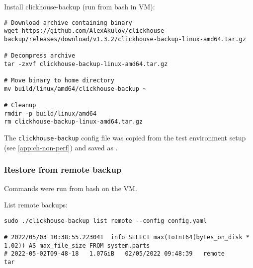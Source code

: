 Install clickhouse-backup (run from bash in VM):
\begin{verbatim}
# Download archive containing binary
wget https://github.com/AlexAkulov/clickhouse-backup/releases/download/v1.3.2/clickhouse-backup-linux-amd64.tar.gz

# Decompress archive
tar -zxvf clickhouse-backup-linux-amd64.tar.gz

# Move binary to home directory
mv build/linux/amd64/clickhouse-backup ~

# Cleanup
rmdir -p build/linux/amd64
rm clickhouse-backup-linux-amd64.tar.gz
\end{verbatim}

The \texttt{clickhouse-backup} config file was copied from
the test environment setup (see \ref{app:ch-non-perf})
and saved as .

\subsubsection{Restore from remote backup}
\label{sec:org8a05b22}
Commands were run from bash on the VM.

List remote backups:
\begin{verbatim}
sudo ./clickhouse-backup list remote --config config.yaml

# 2022/05/03 10:38:55.223041  info SELECT max(toInt64(bytes_on_disk * 1.02)) AS max_file_size FROM system.parts
# 2022-05-02T09-48-18   1.07GiB   02/05/2022 09:48:39   remote      tar
\end{verbatim}

